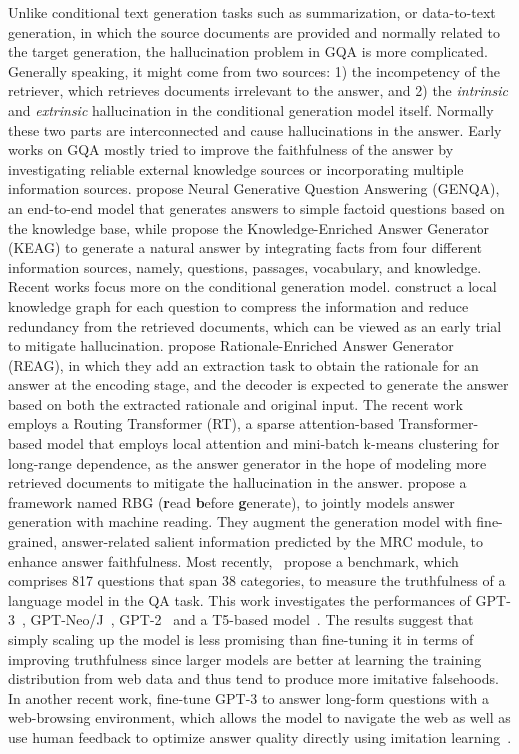 Unlike conditional text generation tasks such as summarization, or data-to-text generation, in which the source documents are provided and normally related to the target generation, the hallucination problem in GQA is more complicated. Generally speaking, it might come from two sources: 1) the incompetency of the retriever, which retrieves documents irrelevant to the answer, and 2) the \textit{intrinsic} and \textit{extrinsic} hallucination in the conditional generation model itself. Normally these two parts are interconnected and cause hallucinations in the answer.
Early works on GQA mostly tried to improve the faithfulness of the answer by investigating reliable external knowledge sources or incorporating multiple information sources.
 propose Neural Generative Question Answering (GENQA), an end-to-end model that generates answers to simple factoid questions based on the knowledge base, while  propose the Knowledge-Enriched Answer Generator (KEAG) to generate a natural answer by integrating facts from four different information sources, namely, questions, passages, vocabulary, and knowledge. 
Recent works focus more on the conditional generation model.  construct a local knowledge graph for each question to compress the information and reduce redundancy from the retrieved documents, which can be viewed as an early trial to mitigate hallucination.  propose Rationale-Enriched Answer Generator (REAG), in which they add an extraction task to obtain the rationale for an answer at the encoding stage, and the decoder is expected to generate the answer based on both the extracted rationale and original input. The recent work~ employs a Routing Transformer (RT), a sparse attention-based Transformer-based model that employs local attention and mini-batch k-means clustering for long-range dependence, as the answer generator in the hope of modeling more retrieved documents to mitigate the hallucination in the answer.  propose a framework named RBG (\textbf{r}ead \textbf{b}efore \textbf{g}enerate), to jointly models answer generation with machine reading. They augment the generation model with fine-grained, answer-related salient information predicted by the MRC module, to enhance answer faithfulness.
Most recently,~ propose a benchmark, which comprises 817 questions that span 38 categories, to measure the truthfulness of a language model in the QA task. This work investigates the performances of GPT-3~, GPT-Neo/J~, GPT-2~ and a T5-based model~. The results suggest that simply scaling up the model is less promising than fine-tuning it in terms of improving truthfulness since larger models are better at learning the training distribution from web data and thus tend to produce more imitative falsehoods. In another recent work,  fine-tune GPT-3 to answer long-form questions with a web-browsing environment, which allows the model to navigate the web as well as use human feedback to optimize answer quality directly using imitation learning~. 
